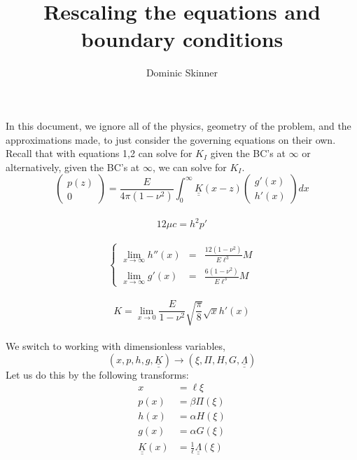 \documentclass{article}
\begin{document}
\title{Rescaling the equations and boundary conditions}
\author{Dominic Skinner}
\maketitle
In this document, we ignore all of the physics, geometry of the problem, and 
the approximations made, to just consider the governing equations on their
own. Recall that with equations 1,2 can solve for $K_I$ given the BC's at 
$\infty$ or alternatively, given the BC's at $\infty$, we can solve for $K_I$.
\\
\begin{equation}
 \left( \begin{array}{c} p(z) \\ 0 \end{array} \right) =
\frac{E}{4\pi (1-\nu^2)} \int_0^{\infty} 
\underline{\underline{K}}(x-z) 
\left( \begin{array}{c} g'(x) \\ h'(x) \end{array} \right) dx
\end{equation}
\\
\begin{equation}
12\mu c = h^2 p'
\end{equation}
\\
\begin{equation}
\left\{ \begin{array}{ccc}
\displaystyle \lim_{x\to\infty} h''(x) & = & \frac{12(1-\nu^2)}{E\ell^3} M \\
\displaystyle \lim_{x\to\infty} g'(x) & = & \frac{6(1-\nu^2)}{E\ell^3} M 
\end{array} \right.
\end{equation}
\\
\begin{equation}
K = \lim_{x\to 0} \frac{E}{1-\nu^2} \sqrt{\frac{\pi}{8}} \sqrt{x} h'(x)
\end{equation}
\\
We switch to working with dimensionless variables, 
\[ (x,p,h,g,\underline{\underline{K}}) \to (\xi, \Pi, H, G, 
\underline{\underline{\Lambda}} )\]
Let us do this by the following transforms:
\begin{align*}
x &= \ell \xi \\
p(x) &= \beta \Pi (\xi) \\
h(x) &= \alpha H(\xi) \\
g(x) &= \alpha G(\xi) \\
\underline{\underline{K}}(x) &= \frac{1}{\ell} 
\underline{\underline{\Lambda}}(\xi) \end{align*}
\end{document}

